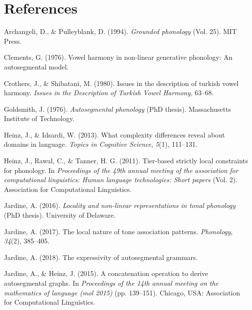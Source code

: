\documentclass[,doc,floatsintext]{apa6}
\theoremstyle{definition}
\theoremstyle{definition}
\theoremstyle{definition}
\theoremstyle{remark}
\begin{document}
\newpage

\section{References}\label{references}

\setlength{\parindent}{-0.5in} \setlength{\leftskip}{0.5in}

\hypertarget{refs}{}
\hypertarget{ref-archangelipulleyblank1994}{}
Archangeli, D., \& Pulleyblank, D. (1994). \emph{Grounded phonology}
(Vol. 25). MIT Press.

\hypertarget{ref-Clements1976}{}
Clements, G. (1976). Vowel harmony in non-linear generative phonology:
An autosegmental model.

\hypertarget{ref-crothersshibatani1980}{}
Crothers, J., \& Shibatani, M. (1980). Issues in the description of
turkish vowel harmony. \emph{Issues in the Description of Turkish Vowel
Harmony}, 63--68.

\hypertarget{ref-Goldsmith1976}{}
Goldsmith, J. (1976). \emph{Autosegmental phonology} (PhD thesis).
Massachusetts Institute of Technology.

\hypertarget{ref-heinzidsardi2013}{}
Heinz, J., \& Idsardi, W. (2013). What complexity differences reveal
about domains in language. \emph{Topics in Cognitive Science},
\emph{5}(1), 111--131.

\hypertarget{ref-heinzetaltsl}{}
Heinz, J., Rawal, C., \& Tanner, H. G. (2011). Tier-based strictly local
constraints for phonology. In \emph{Proceedings of the 49th annual
meeting of the association for computational linguistics: Human language
technologies: Short papers} (Vol. 2). Association for Computational
Linguistics.

\hypertarget{ref-jardinediss}{}
Jardine, A. (2016). \emph{Locality and non-linear representations in
tonal phonology} (PhD thesis). University of Delaware.

\hypertarget{ref-jardinelocaltone}{}
Jardine, A. (2017). The local nature of tone association patterns.
\emph{Phonology}, \emph{34}(2), 385--405.

\hypertarget{ref-jardineexpressag}{}
Jardine, A. (2018). The expressivity of autosegmental grammars.

\hypertarget{ref-jardineheinz2015}{}
Jardine, A., \& Heinz, J. (2015). A concatenation operation to derive
autosegmental graphs. In \emph{Proceedings of the 14th annual meeting on
the mathematics of language (mol 2015)} (pp. 139--151). Chicago, USA:
Association for Computational Linguistics.
\end{document}
